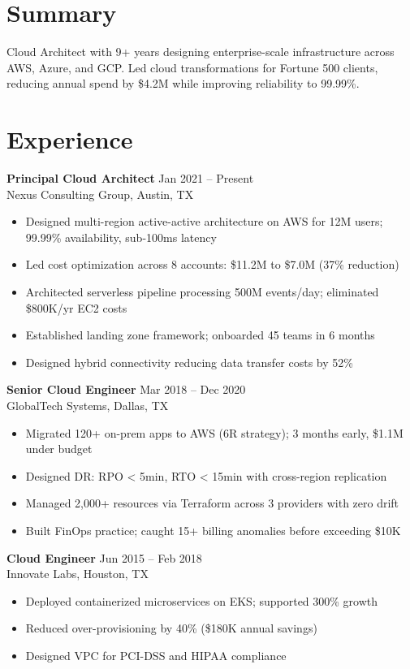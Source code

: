 \documentclass[9.5pt,a4paper]{article}
\begin{document}
\hfill
\begin{minipage}[t]{0.67\textwidth}

\section{Summary}
Cloud Architect with 9+ years designing enterprise-scale infrastructure across AWS, Azure, and GCP. Led cloud transformations for Fortune 500 clients, reducing annual spend by \$4.2M while improving reliability to 99.99\%.

\section{Experience}

\textbf{Principal Cloud Architect} \hfill Jan 2021 -- Present\\
{\color{accent}Nexus Consulting Group}, Austin, TX
\begin{itemize}
  \item Designed multi-region active-active architecture on AWS for 12M users; 99.99\% availability, sub-100ms latency
  \item Led cost optimization across 8 accounts: \$11.2M to \$7.0M (37\% reduction)
  \item Architected serverless pipeline processing 500M events/day; eliminated \$800K/yr EC2 costs
  \item Established landing zone framework; onboarded 45 teams in 6 months
  \item Designed hybrid connectivity reducing data transfer costs by 52\%
\end{itemize}

\textbf{Senior Cloud Engineer} \hfill Mar 2018 -- Dec 2020\\
{\color{accent}GlobalTech Systems}, Dallas, TX
\begin{itemize}
  \item Migrated 120+ on-prem apps to AWS (6R strategy); 3 months early, \$1.1M under budget
  \item Designed DR: RPO < 5min, RTO < 15min with cross-region replication
  \item Managed 2,000+ resources via Terraform across 3 providers with zero drift
  \item Built FinOps practice; caught 15+ billing anomalies before exceeding \$10K
\end{itemize}

\textbf{Cloud Engineer} \hfill Jun 2015 -- Feb 2018\\
{\color{accent}Innovate Labs}, Houston, TX
\begin{itemize}
  \item Deployed containerized microservices on EKS; supported 300\% growth
  \item Reduced over-provisioning by 40\% (\$180K annual savings)
  \item Designed VPC for PCI-DSS and HIPAA compliance
\end{itemize}

\end{minipage}
\end{document}
